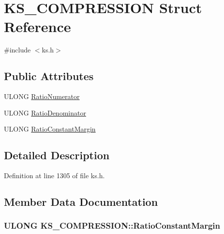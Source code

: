 \hypertarget{struct_k_s___c_o_m_p_r_e_s_s_i_o_n}{}\section{K\+S\+\_\+\+C\+O\+M\+P\+R\+E\+S\+S\+I\+ON Struct Reference}
\label{struct_k_s___c_o_m_p_r_e_s_s_i_o_n}


{\ttfamily \#include $<$ks.\+h$>$}

\subsection*{Public Attributes}
\begin{DoxyCompactItemize}
\item 
U\+L\+O\+NG \hyperlink{struct_k_s___c_o_m_p_r_e_s_s_i_o_n_aa7503a4b4300c8e2aa9c3d78cdbdf4c0}{Ratio\+Numerator}
\item 
U\+L\+O\+NG \hyperlink{struct_k_s___c_o_m_p_r_e_s_s_i_o_n_a29316b7c677bd3593807cf5de26c8234}{Ratio\+Denominator}
\item 
U\+L\+O\+NG \hyperlink{struct_k_s___c_o_m_p_r_e_s_s_i_o_n_a9f56abaadc167710cf2aa86b0165e5c8}{Ratio\+Constant\+Margin}
\end{DoxyCompactItemize}


\subsection{Detailed Description}


Definition at line 1305 of file ks.\+h.



\subsection{Member Data Documentation}
\subsubsection[{\texorpdfstring{Ratio\+Constant\+Margin}{RatioConstantMargin}}]{\setlength{\rightskip}{0pt plus 5cm}U\+L\+O\+NG K\+S\+\_\+\+C\+O\+M\+P\+R\+E\+S\+S\+I\+O\+N\+::\+Ratio\+Constant\+Margin}\hypertarget{struct_k_s___c_o_m_p_r_e_s_s_i_o_n_a9f56abaadc167710cf2aa86b0165e5c8}{}\label{struct_k_s___c_o_m_p_r_e_s_s_i_o_n_a9f56abaadc167710cf2aa86b0165e5c8}


